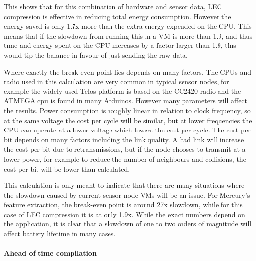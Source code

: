 This shows that for this combination of hardware and sensor data, LEC compression is effective in reducing total energy consumption. However the energy saved is only 1.7x more than the extra energy expended on the CPU. This means that if the slowdown from running this in a VM is more than 1.9, and thus time and energy spent on the CPU increases by a factor larger than 1.9, this would tip the balance in favour of just sending the raw data.

Where exactly the break-even point lies depends on many factors. The CPUs and radio used in this calculation are very common in typical sensor nodes, for example the widely used Telos platform \cite{Polastre:2005ut} is based on the CC2420 radio and the ATMEGA cpu is found in many Arduinos. However many parameters will affect the results. Power consumption is roughly linear in relation to clock frequency, so at the same voltage the cost per cycle will be similar, but at lower frequencies the CPU can operate at a lower voltage which lowers the cost per cycle. The cost per bit depends on many factors including the link quality. A bad link will increase the cost per bit due to retransmissions, but if the node chooses to transmit at a lower power, for example to reduce the number of neighbours and collisions, the cost per bit will be lower than calculated.

This calculation is only meant to indicate that there are many situations where the slowdown caused by current sensor node VMs will be an issue. For Mercury's feature extraction, the break-even point is around 27x slowdown, while for this case of LEC compression it is at only 1.9x. While the exact numbers depend on the application, it is clear that a slowdown of one to two orders of magnitude will affect battery lifetime in many cases.

\paragraph{Ahead of time compilation}

